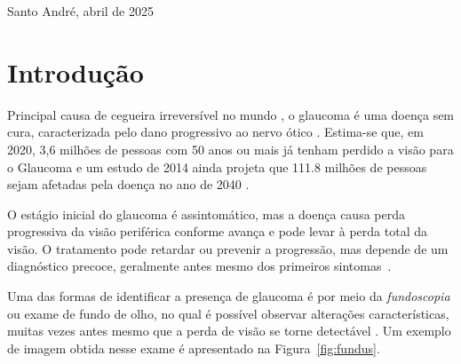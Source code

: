 \documentclass[12pt]{article}
\begin{document}
\begin{center}
Santo André, abril de 2025
\end{center}

\newpage
\bigskip

\section{Introdução}
\label{sec:introducao}

Principal causa de cegueira irreversível no mundo \cite{steinmetz_causes_2021}, o glaucoma é uma doença sem cura, caracterizada pelo dano progressivo ao nervo ótico \cite{who_2019}. Estima-se que, em 2020, 3,6 milhões de pessoas com 50 anos ou mais já tenham perdido a visão para o Glaucoma \cite{steinmetz_causes_2021} e um estudo de 2014 ainda projeta que 111.8 milhões de pessoas sejam afetadas pela doença no ano de 2040 \cite{tham_global_2014}.

O estágio inicial do glaucoma é assintomático, mas a doença causa perda progressiva da visão periférica conforme avança e pode levar à perda total da visão. O tratamento pode retardar ou prevenir a progressão, mas depende de um diagnóstico precoce, geralmente antes mesmo dos primeiros sintomas~\cite{who_2019}.

Uma das formas de identificar a presença de glaucoma é por meio da \emph{fundoscopia} ou exame de fundo de olho, no qual é possível observar alterações características, muitas vezes antes mesmo que a perda de visão se torne detectável \cite{weinreb_2004}. Um exemplo de imagem obtida nesse exame é apresentado na Figura~\ref{fig:fundus}.
\end{document}
